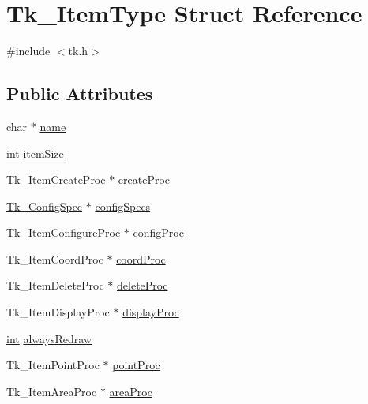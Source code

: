 \hypertarget{struct_tk___item_type}{}\section{Tk\+\_\+\+Item\+Type Struct Reference}
\label{struct_tk___item_type}


{\ttfamily \#include $<$tk.\+h$>$}

\subsection*{Public Attributes}
\begin{DoxyCompactItemize}
\item 
char $\ast$ \hyperlink{struct_tk___item_type_ae0bb1e33f2d6513abf5df5ba768076ed}{name}
\item 
\hyperlink{tk_8h_a83f82f76e7fed06f4c49d2db94028a6d}{int} \hyperlink{struct_tk___item_type_af8ca95c0cd5e2370527177da0b144523}{item\+Size}
\item 
Tk\+\_\+\+Item\+Create\+Proc $\ast$ \hyperlink{struct_tk___item_type_a8aa2cfaa686fcfd4ed553982c3748376}{create\+Proc}
\item 
\hyperlink{struct_tk___config_spec}{Tk\+\_\+\+Config\+Spec} $\ast$ \hyperlink{struct_tk___item_type_a63b2a92fdc2c488c3306a0b9ba460017}{config\+Specs}
\item 
Tk\+\_\+\+Item\+Configure\+Proc $\ast$ \hyperlink{struct_tk___item_type_aaade5e66e42505c9a34d857fb2c505fa}{config\+Proc}
\item 
Tk\+\_\+\+Item\+Coord\+Proc $\ast$ \hyperlink{struct_tk___item_type_ae1ebdf955083d6c3ccee11e7878948b6}{coord\+Proc}
\item 
Tk\+\_\+\+Item\+Delete\+Proc $\ast$ \hyperlink{struct_tk___item_type_a2db0977c9dd7d88d641cb1bd1736b7ec}{delete\+Proc}
\item 
Tk\+\_\+\+Item\+Display\+Proc $\ast$ \hyperlink{struct_tk___item_type_a8060346c44902fab0e9d05832290bee8}{display\+Proc}
\item 
\hyperlink{tk_8h_a83f82f76e7fed06f4c49d2db94028a6d}{int} \hyperlink{struct_tk___item_type_a8da252dbcc6a33571a750bbdce75eb4b}{always\+Redraw}
\item 
Tk\+\_\+\+Item\+Point\+Proc $\ast$ \hyperlink{struct_tk___item_type_a71b6b301e239157c4c62322fdf5a8ee2}{point\+Proc}
\item 
Tk\+\_\+\+Item\+Area\+Proc $\ast$ \hyperlink{struct_tk___item_type_a41b3f409e52b00c97fbf53ab0811a019}{area\+Proc}
\item 

\end{DoxyCompactItemize}
